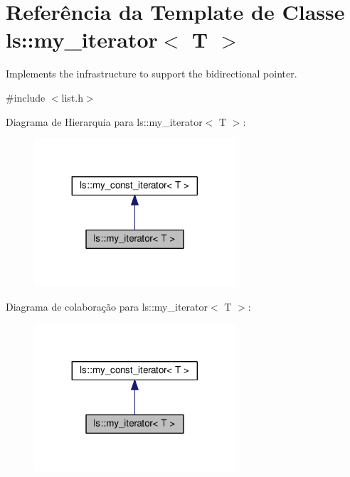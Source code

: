 \hypertarget{classls_1_1my__iterator}{}\section{Referência da Template de Classe ls\+:\+:my\+\_\+iterator$<$ T $>$}
\label{classls_1_1my__iterator}


Implements the infrastructure to support the bidirectional pointer.  




{\ttfamily \#include $<$list.\+h$>$}



Diagrama de Hierarquia para ls\+:\+:my\+\_\+iterator$<$ T $>$\+:\nopagebreak
\begin{figure}[H]
\begin{center}
\leavevmode
\includegraphics[width=212pt]{classls_1_1my__iterator__inherit__graph}
\end{center}
\end{figure}


Diagrama de colaboração para ls\+:\+:my\+\_\+iterator$<$ T $>$\+:\nopagebreak
\begin{figure}[H]
\begin{center}
\leavevmode
\includegraphics[width=212pt]{classls_1_1my__iterator__coll__graph}
\end{center}
\end{figure}
